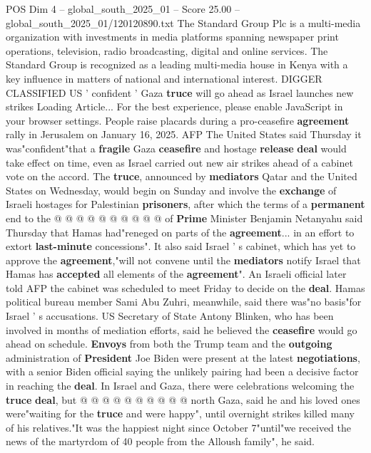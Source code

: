 \begin{textsample}{POS Dim 4 – global\_south\_2025\_01 – Score 25.00 – global\_south\_2025\_01/120120890.txt}  \label{ex:f4_pos_017}
The Standard Group Plc is a multi-media organization with investments in media platforms spanning newspaper print operations, television, radio broadcasting, digital and online services.
The Standard Group is recognized as a leading multi-media house in Kenya with a key influence in matters of national and international interest.
DIGGER CLASSIFIED US ' confident ' Gaza \textbf{truce} will go ahead as Israel launches new strikes Loading Article...
For the best experience, please enable JavaScript in your browser settings.
People raise placards during a pro-ceasefire \textbf{agreement} rally in Jerusalem on January 16, 2025.
AFP The United States said Thursday it was"confident"that a \textbf{fragile} Gaza \textbf{ceasefire} and hostage \textbf{release} \textbf{deal} would take effect on time, even as Israel carried out new air strikes ahead of a cabinet vote on the accord.
The \textbf{truce}, announced by \textbf{mediators} Qatar and the United States on Wednesday, would begin on Sunday and involve the \textbf{exchange} of Israeli hostages for Palestinian \textbf{prisoners}, after which the terms of a \textbf{permanent} end to the @ @ @ @ @ @ @ @ @ @ of \textbf{Prime} Minister Benjamin Netanyahu said Thursday that Hamas had"reneged on parts of the \textbf{agreement}... in an effort to extort \textbf{last-minute} concessions".
It also said Israel ' s cabinet, which has yet to approve the \textbf{agreement},"will not convene until the \textbf{mediators} notify Israel that Hamas has \textbf{accepted} all elements of the \textbf{agreement}".
An Israeli official later told AFP the cabinet was scheduled to meet Friday to decide on the \textbf{deal}.
Hamas political bureau member Sami Abu Zuhri, meanwhile, said there was"no basis"for Israel ' s accusations.
US Secretary of State Antony Blinken, who has been involved in months of mediation efforts, said he believed the \textbf{ceasefire} would go ahead on schedule. \textbf{Envoys} from both the Trump team and the \textbf{outgoing} administration of \textbf{President} Joe Biden were present at the latest \textbf{negotiations}, with a senior Biden official saying the unlikely pairing had been a decisive factor in reaching the \textbf{deal}.
In Israel and Gaza, there were celebrations welcoming the \textbf{truce} \textbf{deal}, but @ @ @ @ @ @ @ @ @ @ north Gaza, said he and his loved ones were"waiting for the \textbf{truce} and were happy", until overnight strikes killed many of his relatives."It was the happiest night since October 7"until"we received the news of the martyrdom of 40 people from the Alloush family", he said.

\end{textsample}
